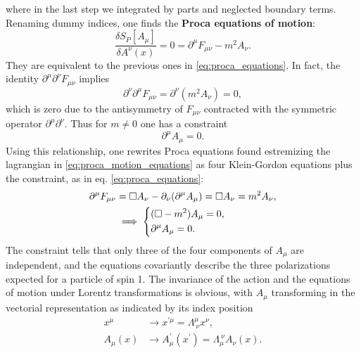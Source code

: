 where in the last step we integrated by parts and neglected boundary terms. Renaming dummy indices, one finds the \textbf{Proca equations of motion}:
\begin{equation}
    \frac{\delta S_P[A_\mu]}{\delta A^\nu(x)} = 0 = \partial^{\mu}F_{\mu \nu} - m^2 A_\nu.
    \label{eq:proca_motion_equations}
\end{equation}
They are equivalent to the previous ones in \eqref{eq:proca_equations}. In fact, the identity \(\partial^{\mu} \partial^{\nu} F_{\mu \nu}\)  implies
\[
    \partial^{\nu} \partial^{\mu} F_{\mu \nu} = \partial^{\nu}(m^2 A_\nu) = 0,
\]
which is zero due to the antisymmetry of \(F_{\mu \nu}\) contracted with the symmetric operator \(\partial^{\mu} \partial^{\nu}\). Thus for \(m\neq 0\) one has a constraint
\[
    \partial^{\mu} A_\mu = 0.
\]
Using this relationship, one rewrites Proca equations found estremizing the lagrangian in \eqref{eq:proca_motion_equations} as four Klein-Gordon equations plus the constraint, as in eq. \eqref{eq:proca_equations}:
\[
    \begin{aligned}
        \partial^{\mu} F_{\mu \nu} & = \Box A_\nu - \partial_\nu (\partial^{\mu} A_\mu) = \Box A_\nu = m^2 A_\nu, \\
                                   & \implies \begin{dcases}
                                                  (\Box -m^2) A_{\mu} = 0, \\
                                                  \partial^{\mu} A_{\mu} = 0.
                                              \end{dcases}
    \end{aligned}
\]
The constraint tells that only three of the four components of \(A_\mu\) are independent, and the equations covariantly describe the three polarizations expected for a particle of spin 1. The invariance of the action and the equations of motion under Lorentz transformations is obvious, with \(A_\mu\) transforming in the vectorial representation as indicated by its index position
\[
    \begin{aligned}
        x^{\mu}    & \to x^{\prime \mu} = \Lambda^{\mu}_{\ \nu} x^{\nu},                  \\
        A_{\mu}(x) & \to A^{\prime}_{\mu}(x^{\prime}) = \Lambda_{\mu}^{\ \nu} A_{\nu}(x).
    \end{aligned}
\]

